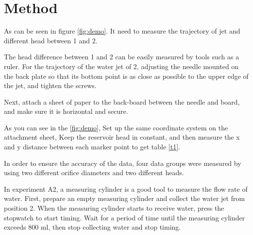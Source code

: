 \section{Method}

As can be seen in figure \ref{fig:demo}.  
It need to measure the trajectory of jet and different head between 1 and 2.  

The head difference between 1 and 2 can be easily measured by tools such as a ruler.
For the trajectory of the water jet of 2, 
adjusting the needle mounted on the back plate so that its bottom point is as close as possible 
to the upper edge of the jet, and tighten the screws.

Next, attach a sheet 
of paper to the back-board between the needle and board,
and make sure it is horizontal and secure.

As you can see in the \autoref{fig:demo},
Set up the same coordinate system on the attachment sheet,
Keep the reservoir head in constant, 
and then measure the x and y distance between each marker point to get table 
\ref{t1}.

In order to ensure the accuracy of the data, 
four data groups were measured by using two different orifice diameters and 
two different heads.

In experiment A2, a measuring cylinder is a good tool to measure the flow rate of water. 
First, prepare an empty measuring cylinder and collect the water jet from position 2. 
When the measuring cylinder starts to receive water, press the stopwatch to start timing. 
Wait for a period of time until the measuring cylinder exceeds 800 ml, 
then stop collecting water and stop timing.
















